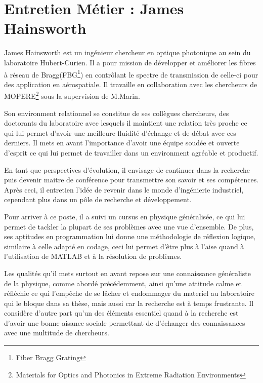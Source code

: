 \documentclass[11pt, openright]{book}
\begin{document}


    \thispagestyle{head}

    \section*{Entretien Métier : James Hainsworth}

    James Hainsworth est un ingénieur chercheur en optique photonique au sein du laboratoire Hubert-Curien. Il a pour mission de développer et améliorer les fibres à réseau de Bragg(FBG\footnote[1]{Fiber Bragg Grating}) en contrôlant le spectre de transmission de celle-ci pour des application en aérospatiale. Il travaille en collaboration avec les chercheurs de MOPERE\footnote[2]{Materials for Optics and Photonics in Extreme Radiation Environments} sous la supervision de M.Marin. 
    
    Son environment relationnel se constitue de ses collègues chercheurs, des doctorants du laboratoire avec lesquels il maintient une relation très proche ce qui lui permet d'avoir une meilleure fluidité d'échange et de débat avec ces derniers. Il mets en avant l'importance d'avoir une équipe soudée et ouverte d'esprit ce qui lui permet de travailler dans un environment agréable et productif. 

    En tant que perspectives d'évolution, il envisage de continuer dans la recherche puis devenir maitre de conférence pour transmettre son savoir et ses compétences. Après ceci, il entretien l'idée de revenir dans le monde d'ingénierie industriel, cependant plus dans un pôle de recherche et développement.

    Pour arriver à ce poste, il a suivi un cursus en physique généralisée, ce qui lui permet de tackler la plupart de ses problèmes avec une vue d'ensemble. De plus, ses aptitudes en programmation lui donne une méthodologie de réflexion logique, similaire à celle adapté en codage, ceci lui permet d'être plus à l'aise quand à l'utilisation de MATLAB et à la résolution de problèmes. 

    Les qualités qu'il mets surtout en avant repose sur une connaissance généraliste de la physique, comme abordé précédemment, ainsi qu'une attitude calme et réfléchie ce qui l'empêche de se lâcher et endommager du materiel au laboratoire qui le bloque dans sa thèse, mais aussi car la recherche est à temps frustrante.  Il considère d'autre part qu'un des éléments essentiel quand à la recherche est d'avoir une bonne aisance sociale permettant de d'échanger des connaissances avec une multitude de chercheurs. 
\end{document}
